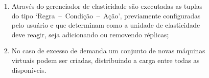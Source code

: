 \documentclass[english,brazilian]{UNISINOSmonografia} %
\begin{document}
\begin{figure}[tbp]
\begin{minipage}{\textwidth}
\begin{minipage}{.8\textwidth}
\begin{enumerate}[leftmargin=*]
				\item Através do gerenciador de elasticidade são executadas as tuplas do tipo \textquoteleft Regra~--~Condição~--~Ação\textquoteright, previamente configuradas pelo usuário e que determinam como a unidade de elasticidade deve reagir, seja adicionando ou removendo réplicas;
				\item No caso de excesso de demanda um conjunto de novas máquinas virtuais podem ser criadas, distribuindo a carga entre todas as disponíveis.
			\end{enumerate}
		\end{minipage}
%
	\end{minipage}
\end{figure}







\end{document}
